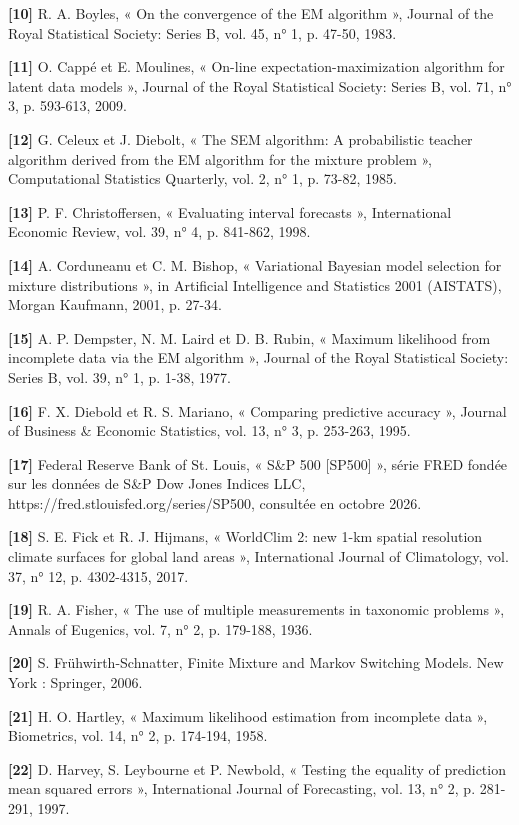 \textbf{[10]  }R. A. Boyles, « On the convergence of the EM algorithm », Journal of the Royal Statistical Society: Series B, vol. 45, n° 1, p. 47-50, 1983.

\textbf{[11]  }O. Cappé et E. Moulines, « On-line expectation-maximization algorithm for latent data models », Journal of the Royal Statistical Society: Series B, vol. 71, n° 3, p. 593-613, 2009.

\textbf{[12]  }G. Celeux et J. Diebolt, « The SEM algorithm: A probabilistic teacher algorithm derived from the EM algorithm for the mixture problem », Computational Statistics Quarterly, vol. 2, n° 1, p. 73-82, 1985.

\textbf{[13]  }P. F. Christoffersen, « Evaluating interval forecasts », International Economic Review, vol. 39, n° 4, p. 841-862, 1998.

\textbf{[14]  }A. Corduneanu et C. M. Bishop, « Variational Bayesian model selection for mixture distributions », in Artificial Intelligence and Statistics 2001 (AISTATS), Morgan Kaufmann, 2001, p. 27-34.

\textbf{[15]  }A. P. Dempster, N. M. Laird et D. B. Rubin, « Maximum likelihood from incomplete data via the EM algorithm », Journal of the Royal Statistical Society: Series B, vol. 39, n° 1, p. 1-38, 1977.

\textbf{[16]  }F. X. Diebold et R. S. Mariano, « Comparing predictive accuracy », Journal of Business \& Economic Statistics, vol. 13, n° 3, p. 253-263, 1995.

\textbf{[17]  }Federal Reserve Bank of St. Louis, « S\&P 500 [SP500] », série FRED fondée sur les données de S\&P Dow Jones Indices LLC, https://fred.stlouisfed.org/series/SP500, consultée en octobre 2026.

\textbf{[18]  }S. E. Fick et R. J. Hijmans, « WorldClim 2: new 1-km spatial resolution climate surfaces for global land areas », International Journal of Climatology, vol. 37, n° 12, p. 4302-4315, 2017.

\textbf{[19]  }R. A. Fisher, « The use of multiple measurements in taxonomic problems », Annals of Eugenics, vol. 7, n° 2, p. 179-188, 1936.

\textbf{[20]  }S. Frühwirth-Schnatter, Finite Mixture and Markov Switching Models. New York : Springer, 2006.

\textbf{[21]  }H. O. Hartley, « Maximum likelihood estimation from incomplete data », Biometrics, vol. 14, n° 2, p. 174-194, 1958.

\textbf{[22]  }D. Harvey, S. Leybourne et P. Newbold, « Testing the equality of prediction mean squared errors », International Journal of Forecasting, vol. 13, n° 2, p. 281-291, 1997.

